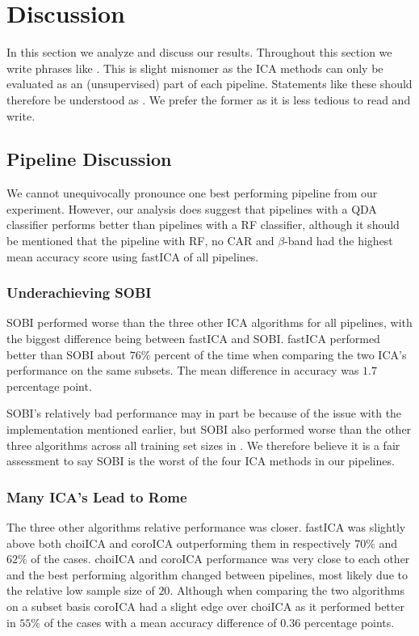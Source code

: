 
\section{Discussion}\label{sec:analysis}

	In this section we analyze and discuss our results. Throughout this section we write phrases like . This is slight misnomer as the ICA methods can only be evaluated as an (unsupervised) part of each pipeline. Statements like these should therefore be understood as . We prefer the former as it is less tedious to read and write. 
	
\subsection{Pipeline Discussion}

	We cannot unequivocally pronounce one best performing pipeline from our experiment. However, our analysis does suggest that pipelines with a QDA classifier performs better than pipelines with a RF classifier, although it should be mentioned that the pipeline with RF, no CAR and $\beta$-band had the highest mean accuracy score using fastICA of all pipelines. 

	\subsubsection{Underachieving SOBI} SOBI performed worse than the three other ICA algorithms for all pipelines, with the biggest difference being between fastICA and SOBI. fastICA performed better than SOBI about $76 \%$ percent of the time when comparing the two ICA's performance on the same subsets. The mean difference in accuracy was $1.7$ percentage point.

	SOBI's relatively bad performance may in part be because of the issue with the implementation mentioned earlier, but SOBI also performed worse than the other three algorithms across all training set sizes in \cite{pfister2019}. We therefore believe it is a fair assessment to say SOBI is the worst of the four ICA methods in our pipelines.

	\subsubsection{Many ICA's Lead to Rome} The three other algorithms relative performance was closer. fastICA was slightly above both choiICA and coroICA outperforming them in respectively $70\%$ and $62\%$ of the cases. choiICA and coroICA performance was very close to each other and the best performing algorithm changed between pipelines, most likely due to the relative low sample size of $20$. Although when comparing the two algorithms on a subset basis coroICA had a slight edge over choiICA as it performed better in $55\%$ of the cases with a mean accuracy difference of $0.36$ percentage points.

